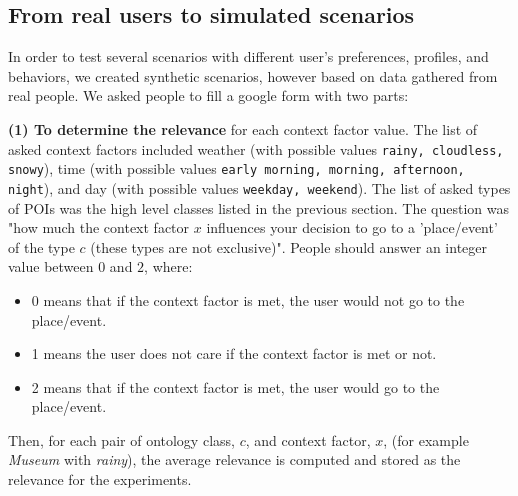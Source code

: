 \vspace{-0.2cm}
\subsection{From real users to simulated scenarios}
\label{section:relevances-survey}

In order to test several scenarios with different user's preferences, profiles, and behaviors,  we created synthetic scenarios, however based on data gathered from real people.
We asked people to fill a google form with two parts: 

    \noindent
    {\bf (1) To determine the relevance} for each context factor value. The list of asked context factors included weather (with possible values {\tt rainy, cloudless, snowy}), time (with possible values {\tt early morning, morning, afternoon, night}), and day (with possible values {\tt weekday, weekend}). The list of asked types of POIs was the high level classes listed in the previous section. The question was     "how much the context factor $x$ influences your decision to go to a 'place/event' of the type $c$ (these types are not exclusive)". People should answer an integer value between $0$ and $2$, where: 
\begin{itemize}
    \item $0$ means that if the context factor 
    is met, the user
    would not go to the place/event.
    \item 1 means the user does
    not care if the context factor is met or not.
    \item 2 means that if the context factor is met, 
    the user would go to the place/event.
\end{itemize}

Then, for each pair of ontology class, $c$, and context factor, $x$, %
(for example \textit{Museum} with \textit{rainy}), the average relevance is computed and stored as the relevance for the experiments.


